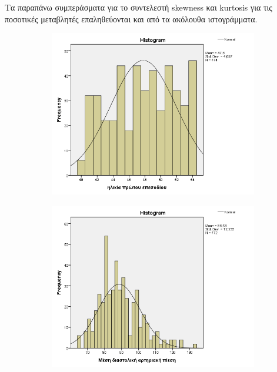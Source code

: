 Τα παραπάνω συμπεράσματα για το συντελεστή skewness και kurtosis για τις ποσοτικές μεταβλητές επαληθεύονται και από τα ακόλουθα ιστογράμματα.

\begin{figure}[hb]
 \centering
            \begin{subfigure}{0.65\textwidth}
     \centering
         \includegraphics[width=\textwidth]{images/12.png}
                      \end{subfigure}
                     
     \begin{subfigure}{0.65\textwidth}
     \centering
     \vspace{0.5cm}
         \includegraphics[width=\textwidth]{images/13.png}
                      \end{subfigure}
    \end{figure}
    
